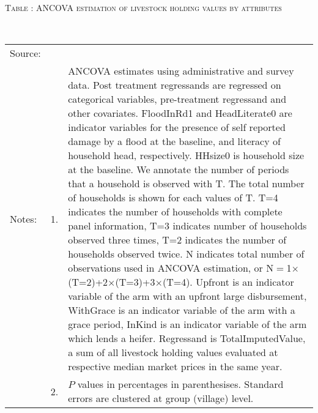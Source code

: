 \hspace{-1cm}\begin{minipage}[t]{14cm}
\hfil\textsc{\normalsize Table \thetable: ANCOVA estimation of livestock holding values by attributes\label{tab ANCOVA livestock attributes}}\\
\setlength{\tabcolsep}{1pt}
\setlength{\baselineskip}{8pt}
\renewcommand{\arraystretch}{.55}
\hfil{}\\
\renewcommand{\arraystretch}{.8}
\setlength{\tabcolsep}{1pt}
\begin{tabular}{>{\hfill\scriptsize}p{1cm}<{}>{\hfill\scriptsize}p{.25cm}<{}>{\scriptsize}p{12cm}<{\hfill}}
Source:& \multicolumn{2}{l}{\scriptsize Estimated with GUK administrative and survey data.}\\
Notes: & 1. & ANCOVA estimates using administrative and survey data. Post treatment regressands are regressed on categorical variables, pre-treatment regressand and other covariates. \textsf{FloodInRd1} and \textsf{HeadLiterate0} are indicator variables for the presence of self reported damage by a flood at the baseline, and literacy of household head, respectively. \textsf{HHsize0} is household size at the baseline. We annotate the number of periods that a household is observed with \textsf{T}. The total number of households is shown for each values of \textsf{T}. \textsf{T=4} indicates the number of households with complete panel information, \textsf{T=3} indicates number of households observed three times, \textsf{T=2} indicates the number of households observed twice. \textsf{N} indicates total number of observations used in ANCOVA estimation, or \textsf{N$=$1$\times$(T=2)+2$\times$(T=3)+3$\times$(T=4)}.  \textsf{Upfront} is an indicator variable of the arm with an upfront large disbursement, \textsf{WithGrace} is an indicator variable of the arm with a grace period, \textsf{InKind} is an indicator variable of the arm which lends a heifer. Regressand is \textsf{TotalImputedValue}, a sum of all livestock holding values evaluated at respective median market prices in the same year. \\
& 2. & $P$ values in percentages in parenthesises. Standard errors are clustered at group (village) level.
\end{tabular}
\end{minipage}



